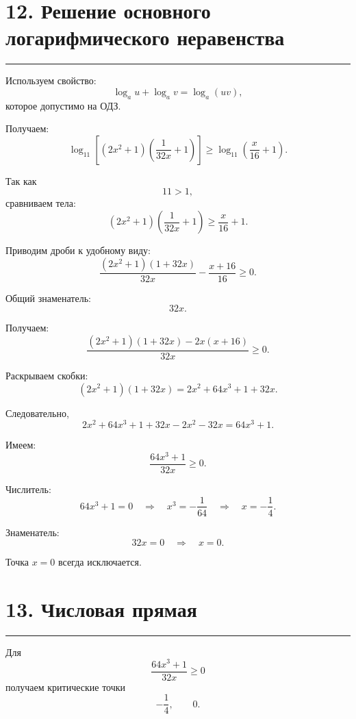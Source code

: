 \documentclass[a4paper,12pt]{article}
\newcommand{\sectionline}{%
    \vspace{0.2em}
    \noindent\color{linegray}\rule{\linewidth}{0.6pt}
    \vspace{0.4em}
}
\begin{document}
\section*{\color{darkaccent}12. Решение основного логарифмического неравенства}
\sectionline

Используем свойство:
\[
\log_a u+\log_a v=\log_a(uv),
\]
которое допустимо на ОДЗ.

Получаем:
\[
\log_{11}
\left[
(2x^2+1)
\left(
\frac1{32x}+1
\right)
\right]
\ge
\log_{11}
\left(
\frac{x}{16}+1
\right).
\]

Так как
\[
11>1,
\]
сравниваем тела:
\[
(2x^2+1)
\left(
\frac1{32x}+1
\right)
\ge
\frac{x}{16}+1.
\]

Приводим дроби к удобному виду:
\[
\frac{(2x^2+1)(1+32x)}{32x}
-
\frac{x+16}{16}
\ge0.
\]

Общий знаменатель:
\[
32x.
\]

Получаем:
\[
\frac{
(2x^2+1)(1+32x)-2x(x+16)
}{32x}
\ge0.
\]

Раскрываем скобки:
\[
(2x^2+1)(1+32x)
=
2x^2+64x^3+1+32x.
\]

Следовательно,
\[
2x^2+64x^3+1+32x
-
2x^2
-
32x
=
64x^3+1.
\]

Имеем:
\[
\frac{64x^3+1}{32x}\ge0.
\]

Числитель:
\[
64x^3+1=0
\quad\Longrightarrow\quad
x^3=-\frac1{64}
\quad\Longrightarrow\quad
x=-\frac14.
\]

Знаменатель:
\[
32x=0
\quad\Longrightarrow\quad
x=0.
\]

Точка \(x=0\) всегда исключается.

\section*{\color{darkaccent}13. Числовая прямая}
\sectionline

Для
\[
\frac{64x^3+1}{32x}\ge0
\]
получаем критические точки
\[
-\frac14,\qquad 0.
\]

\begin{center}
\end{center}
\end{document}
